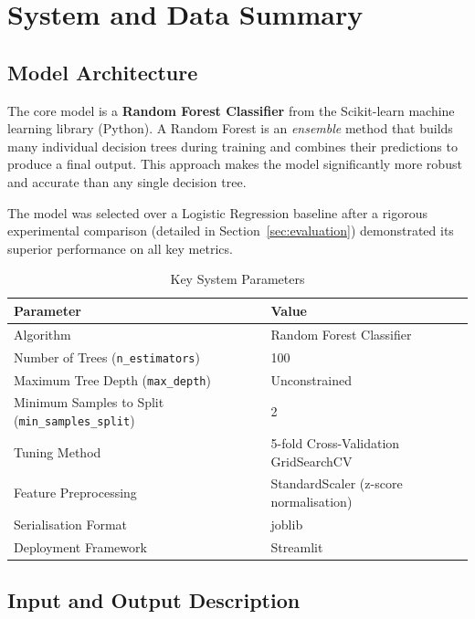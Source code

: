 \documentclass[11pt,a4paper]{article}
\begin{document}
\section{System and Data Summary}

\subsection{Model Architecture}

The core model is a \textbf{Random Forest Classifier} from the Scikit-learn machine learning library (Python). A Random Forest is an \textit{ensemble} method that builds many individual decision trees during training and combines their predictions to produce a final output. This approach makes the model significantly more robust and accurate than any single decision tree.

The model was selected over a Logistic Regression baseline after a rigorous experimental comparison (detailed in Section~\ref{sec:evaluation}) demonstrated its superior performance on all key metrics.

\begin{table}[H]
    \centering
    \caption{Key System Parameters}
    \label{tab:params}
    \begin{tabular}{ll}
        \toprule
        \textbf{Parameter} & \textbf{Value} \\
        \midrule
        Algorithm & Random Forest Classifier \\
        Number of Trees (\texttt{n\_estimators}) & 100 \\
        Maximum Tree Depth (\texttt{max\_depth}) & Unconstrained \\
        Minimum Samples to Split (\texttt{min\_samples\_split}) & 2 \\
        Tuning Method & 5-fold Cross-Validation GridSearchCV \\
        Feature Preprocessing & StandardScaler (z-score normalisation) \\
        Serialisation Format & joblib \\
        Deployment Framework & Streamlit \\
        \bottomrule
    \end{tabular}
\end{table}

\subsection{Input and Output Description}
\end{document}
